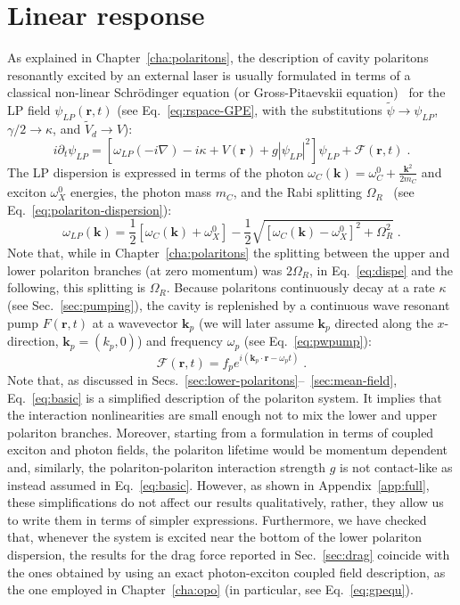 \section{Linear response}
\label{sec:linea}

As explained in Chapter~\ref{cha:polaritons}, the description of
cavity polaritons resonantly excited by an external laser is usually
formulated in terms of a classical non-linear Schr\"odinger equation
(or Gross-Pitaevskii equation)~\cite{Ciuti_2003} for the LP field
$\psi_{LP}(\bm{r}, t)$ (see Eq.~\eqref{eq:rspace-GPE}, with the
substitutions $\tilde{\psi} \rightarrow \psi_{LP}$,
$\gamma/2 \rightarrow \kappa$, and $\tilde{V}_d \rightarrow V$):
%
\begin{equation}
  i \partial_t \psi_{LP} = [\omega_{LP}(-i\nabla) - i\kappa +
    V(\bm{r}) + g |\psi_{LP}|^2]\psi_{LP} + \mathcal{F}(\bm{r},t)\; .
\label{eq:basic}
\end{equation}
%
The LP dispersion is expressed in terms of the photon
$\omega_C(\bm{k}) = \omega_C^0 + \frac{\bm{k}^2}{2m_C}$ and exciton
$\omega_X^0$ energies, the photon mass $m_C$, and the Rabi splitting
$\Omega_R$~\cite{9780199228942} (see
Eq.~\eqref{eq:polariton-dispersion}):
%
\begin{equation}
  \omega_{LP}(\bm{k}) = \frac{1}{2} \left[\omega_C(\bm{k}) +
    \omega_X^0\right]  - \frac{1}{2} \sqrt{\left[\omega_C(\bm{k}) -
    \omega_X^0 \right]^2 + \Omega_R^2} \; .
\label{eq:dispe}
\end{equation}
%
Note that, while in Chapter~\ref{cha:polaritons} the splitting between
the upper and lower polariton branches (at zero momentum) was
$2\Omega_R$, in Eq.~\eqref{eq:dispe} and the following, this splitting
is $\Omega_R$. Because polaritons continuously decay at a rate
$\kappa$ (see Sec.~\ref{sec:pumping}), the cavity is replenished by a
continuous wave resonant pump $F(\bm{r},t)$ at a wavevector $\bm{k}_p$
(we will later assume $\bm{k}_p$ directed along the $x$-direction,
$\bm{k}_p = (k_p,0)$) and frequency $\omega_p$ (see
Eq.~\eqref{eq:pwpump}):
\begin{equation}
  \mathcal{F}(\bm{r},t) = f_p e^{i (\bm{k}_p \cdot \bm{r} -
    \omega_p t)} \; .
\end{equation}
%
Note that, as discussed in
Secs.~\ref{sec:lower-polaritons}--~\ref{sec:mean-field},
Eq.~\eqref{eq:basic} is a simplified description of the polariton
system. It implies that the interaction nonlinearities are small
enough not to mix the lower and upper polariton branches. Moreover,
starting from a formulation in terms of coupled exciton and photon
fields, the polariton lifetime would be momentum dependent and,
similarly, the polariton-polariton interaction strength $g$ is not
contact-like as instead assumed in Eq.~\eqref{eq:basic}. However, as
shown in Appendix~\ref{app:full}, these simplifications do not affect
our results qualitatively, rather, they allow us to write them in
terms of simpler expressions. Furthermore, we have checked that,
whenever the system is excited near the bottom of the lower polariton
dispersion, the results for the drag force reported in
Sec.~\ref{sec:drag} coincide with the ones obtained by using an exact
photon-exciton coupled field description, as the one employed in
Chapter~\ref{cha:opo} (in particular, see Eq.~\eqref{eq:gpequ}).

